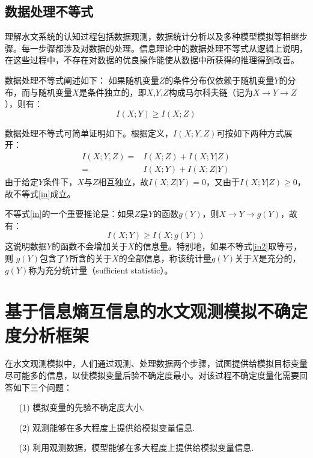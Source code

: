\subsection{数据处理不等式}

理解水文系统的认知过程包括数据观测，数据统计分析以及多种模型模拟等相继步骤。每一步骤都涉及对数据的处理。信息理论中的数据处理不等式从逻辑上说明，在这些过程中，不存在对数据的优良操作能使从数据中所获得的推理得到改善\cite{cover2012elements}。

数据处理不等式阐述如下： 如果随机变量$Z$的条件分布仅依赖于随机变量$Y$的分布，而与随机变量$X$是条件独立的，即$X$,$Y$,$Z$构成马尔科夫链（记为$X \to Y \to Z$ ），则有：
\begin{equation}
\label{in}
I(X;Y) \geq I(X;Z)
\end{equation}

数据处理不等式可简单证明如下。根据定义，$I(X;Y,Z)$可按如下两种方式展开：
\begin{equation}
\begin{split}
I(X;Y,Z)=&I(X;Z)+I(X;Y|Z)\\
        =&I(X;Y)+I(X;Z|Y)
\end{split}
\end{equation}
由于给定$Y$条件下，$X$与$Z$相互独立，故$I(X;Z|Y)=0$，又由于$I(X;Y|Z)\geq 0$，故不等式\ref{in}成立。

不等式\ref{in}的一个重要推论是：如果$Z$是$Y$的函数$g(Y)$，则$X \to Y \to g(Y)$，故有：
\begin{equation}
\label{in2}
I(X;Y) \geq I(X;g(Y))
\end{equation}
这说明数据$Y$的函数不会增加关于$X$的信息量。特别地，如果不等式\ref{in2}取等号， 则 $g(Y)$包含了$Y$所含的关于$X$的全部信息，称该统计量$g(Y)$关于$X$是充分的，$g(Y)$称为充分统计量（sufficient statistic）。

\section{基于信息熵互信息的水文观测模拟不确定度分析框架}

在水文观测模拟中，人们通过观测、处理数据两个步骤，试图提供给模拟目标变量尽可能多的信息，以使模拟变量后验不确定度最小。对该过程不确定度量化需要回答如下三个问题：
\begin{itemize}
\item[(1)]模拟变量的先验不确定度大小.
\item[(2)]观测能够在多大程度上提供给模拟变量信息.
\item[(3)]利用观测数据，模型能够在多大程度上提供给模拟变量信息.
\end{itemize}

